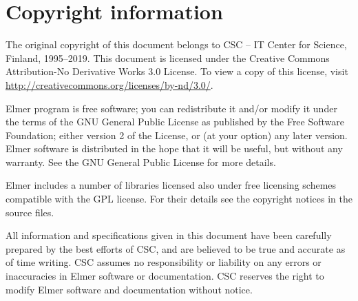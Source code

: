 \section*{Copyright information}

The original copyright of this document belongs to
CSC -- IT Center for Science, Finland, 1995--2019. 
This document is licensed under the Creative Commons Attribution-No Derivative Works 3.0 License. 
To view a copy of this license, visit \url{http://creativecommons.org/licenses/by-nd/3.0/}.

Elmer program is free software; you can redistribute it and/or
modify it under the terms of the GNU General Public License
as published by the Free Software Foundation; either version 2
of the License, or (at your option) any later version.
Elmer software is distributed in the hope that it will be useful,
but without any warranty. See the
GNU General Public License for more details.

Elmer includes a number of libraries licensed also under free licensing 
schemes compatible with the GPL license.
For their details see the copyright notices in the source files. 

All information and specifications
given in this document have been carefully prepared by the best efforts of CSC, and are believed
to be true and accurate as of time writing. 
CSC assumes no responsibility or liability on any errors or inaccuracies in 
Elmer software or documentation. 
CSC reserves the right to 
modify Elmer software and documentation without notice. \\  \mbox{} \\
